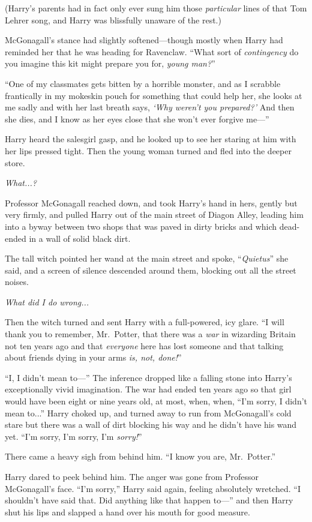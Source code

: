 (Harry’s parents had in fact only ever sung him those \emph{particular} lines of that Tom Lehrer song, and Harry was blissfully unaware of the rest.)

McGonagall’s stance had slightly softened—though mostly when Harry had reminded her that he was heading for Ravenclaw. “What sort of \emph{contingency} do you imagine this kit might prepare you for, \emph{young man?}”

“One of my classmates gets bitten by a horrible monster, and as I scrabble frantically in my mokeskin pouch for something that could help her, she looks at me sadly and with her last breath says, \emph{‘Why weren’t you prepared?’} And then she dies, and I know as her eyes close that she won’t ever forgive me—”

Harry heard the salesgirl gasp, and he looked up to see her staring at him with her lips pressed tight. Then the young woman turned and fled into the deeper store.

\emph{What...?}

Professor McGonagall reached down, and took Harry’s hand in hers, gently but very firmly, and pulled Harry out of the main street of Diagon Alley, leading him into a byway between two shops that was paved in dirty bricks and which dead-ended in a wall of solid black dirt.

The tall witch pointed her wand at the main street and spoke, “\emph{Quietus}” she said, and a screen of silence descended around them, blocking out all the street noises.

\emph{What did I do wrong...}

Then the witch turned and sent Harry with a full-powered, icy glare. “I will thank you to remember, Mr.~Potter, that there was a \emph{war} in wizarding Britain not ten years ago and that \emph{everyone} here has lost someone and that talking about friends dying in your arms \emph{is, not, done!}”

“I, I didn’t mean to—” The inference dropped like a falling stone into Harry’s exceptionally vivid imagination. The war had ended ten years ago so that girl would have been eight or nine years old, at most, when, when, “I’m sorry, I didn’t mean to...” Harry choked up, and turned away to run from McGonagall’s cold stare but there was a wall of dirt blocking his way and he didn’t have his wand yet. “I’m sorry, I’m sorry, I’m \emph{sorry!}”

There came a heavy sigh from behind him. “I know you are, Mr.~Potter.”

Harry dared to peek behind him. The anger was gone from Professor McGonagall’s face. “I’m sorry,” Harry said again, feeling absolutely wretched. “I shouldn’t have said that. Did anything like that happen to—” and then Harry shut his lips and slapped a hand over his mouth for good measure.

